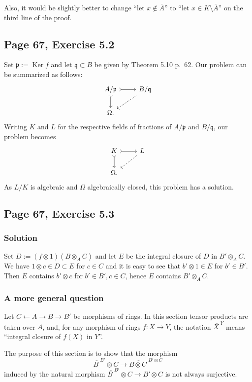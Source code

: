 \documentclass[parskip=half,fontsize=12pt]{scrartcl}%
\newcommand{\oo}{\operatorname}\newcommand{\ooo}{\operatorname*}
\newcommand{\mf}{\mathfrak}
\newcommand{\ppp}{\mf p}
\begin{document}
Also, it would be slightly better to change ``let $x\notin\overline A$'' to ``let $x\in K\setminus\overline A$'' on the third line of the proof.%

\subsection{Page 67, Exercise 5.2}\label{67}%

Set $\ppp:=\oo{Ker}f$ and let $\mf q\subset B$ be given by Theorem 5.10 p.~62. Our problem can be summarized as follows: 
$$
\begin{tikzcd}
A/\ppp\ar[r,tail]\ar[d,tail]&B/\mf q\ar[dl,dashrightarrow]\\ 
\Omega.
\end{tikzcd}
$$ 
Writing $K$ and $L$ for the respective fields of fractions of $A/\ppp$ and $B/\mf q$, our problem becomes  
$$
\begin{tikzcd}
K\ar[r,tail]\ar[d,tail]&L\ar[dl,dashrightarrow]\\ 
\Omega.
\end{tikzcd}
$$ 
As $L/K$ is algebraic and $\Omega$ algebraically closed, this problem has a solution.

\subsection{Page 67, Exercise 5.3}%

\subsubsection{Solution}

Set $D:=(f\otimes1)(B\otimes_AC)$ and let $E$ be the integral closure of $D$ in $B'\otimes_AC$. We have $1\otimes c\in D\subset E$ for $c\in C$ and it is easy to see that $b'\otimes1\in E$ for $b'\in B'$. Then $E$ contains $b'\otimes c$ for $b'\in B',c\in C$, hence $E$ contains $B'\otimes_AC$.

\subsubsection{A more general question}%

Let $C\leftarrow A\to B\to B'$ be morphisms of rings. In this section tensor products are taken over $A$, and, for any morphism of rings $f:X\to Y$, the notation $\overline{X\ }^Y$ means ``integral closure of $f(X)$ in $Y$''. 

The purpose of this section is to show that the morphism 
$$
\overline{B\ }^{B'}\otimes C\to\overline{B\otimes C\ }^{B'\otimes C}
$$ 
induced by the natural morphism $\overline{B\ }^{B'}\otimes C\to B'\otimes C$ is not always surjective. 
\end{document}
